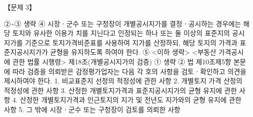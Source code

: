 \begin{longquestion}{【문제 3】}
\begin{framedtext}
②\textasciitilde{}③ 생략 
④ 시장ㆍ군수 또는 구청장이 개별공시지가를 결정ㆍ공시하는 경우에는 해당 토지와 유사한 이용가 치를 지닌다고 인정되는 하나 또는 둘 이상의 표준지의 공시지가를 기준으로 토지가격비준표를 사용하여 지가를 산정하되, 해당 토지의 가격과 표준지공시지가가 균형을 유지하도록 하여야 한다. 
⑤ <이하 생략> <부동산 가격공시에 관한 법률 시행령> 
제18조(개별공시지가의 검증) ① 생략 
② 법 
제10조제5항 본문에 따라 검증을 의뢰받은 감정평가업자는 다음 각 호의 사항을 검토ㆍ확인하고 의견을 제시하여야 한다. 
1. 비교표준지 선정의 적정성에 관한 사항 
2. 개별토지 가격 산정의 적정성에 관한 사항 
3. 산정한 개별토지가격과 표준지공시지가의 균형 유지에 관한 사항 
4. 산정한 개별토지가격과 인근토지의 지가 및 전년도 지가와의 균형 유지에 관한 사항 
5. 그 밖에 시장ㆍ군수 또는 구청장이 검토를 의뢰한 사항
\end{framedtext}

\end{longquestion}
